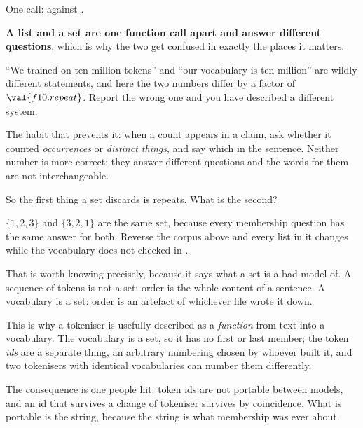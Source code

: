 \begin{fr}
\begin{ansblock}
One call:  against .
\end{ansblock}

\begin{trapbox}
\textbf{A list and a set are one function call apart and answer different
questions}, which is why the two get confused in exactly the places it
matters.

\enquote{We trained on ten million tokens} and \enquote{our vocabulary is ten
million} are wildly different statements, and here the two numbers differ by a
factor of $\val{f10.repeat}$. Report the wrong one and you have described a
different system.

The habit that prevents it: when a count appears in a claim, ask whether it
counted \emph{occurrences} or \emph{distinct things}, and say which in the
sentence. Neither number is more correct; they answer different questions and
the words for them are not interchangeable.
\end{trapbox}

So the first thing a set discards is repeats. What is the second?
\nextframe
\end{fr}

\begin{fr}
$\{1, 2, 3\}$ and $\{3, 2, 1\}$ are the same set, because every membership
question has the same answer for both. Reverse the corpus above and every list
in it changes while the vocabulary does not \dash{} checked in
.

That is worth knowing precisely, because it says what a set is a bad model of.
A sequence of tokens is not a set: order is the whole content of a sentence. A
vocabulary is a set: order is an artefact of whichever file wrote it down.

\begin{aibox}
This is why a tokeniser is usefully described as a \emph{function} from text
into a vocabulary. The vocabulary is a set, so it has no first or last member;
the token \emph{ids} are a separate thing, an arbitrary numbering chosen by
whoever built it, and two tokenisers with identical vocabularies can number
them differently.

The consequence is one people hit: token ids are not portable between models,
and an id that survives a change of tokeniser survives by coincidence. What
is portable is the string, because the string is what membership was ever
about.
\end{aibox}
\end{fr}

